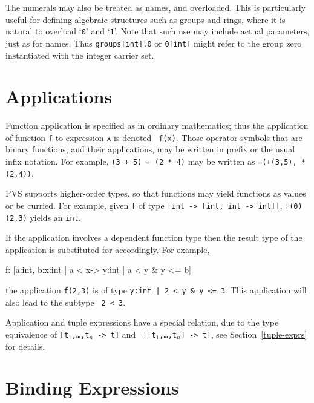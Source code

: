 The numerals may also be treated as names, and
overloaded. This
is particularly useful for defining algebraic structures such as groups
and rings, where it is natural to overload `\texttt{0}' and `\texttt{1}'.
Note that such use may include actual parameters, just as for names.  Thus
\texttt{groups[int].0} or \texttt{0[int]} might refer to the group zero
instantiated with the integer carrier set.

\section{Applications}

Function application is specified as in ordinary mathematics; thus the
application of function \texttt{f} to expression \texttt{x} is denoted \texttt{
f(x)}.  Those operator symbols that are binary functions, and their
applications, may be written in prefix or the usual infix notation.  For
example, \texttt{(3 + 5) = (2 * 4)} may be written as \texttt{=(+(3,5),
*(2,4))}.

PVS supports higher-order types, so that functions may yield functions
as values or be curried.  For example, given
\texttt{f} of type \texttt{[int -> [int, int -> int]]}, \texttt{f(0)(2,3)}
yields an \texttt{int}.

If the application involves a dependent function type then the result
type of the application is substituted for accordingly.  For example,
\begin{pvsex}
  f: [a:int, b:\setb{}x:int | a < x\sete -> \setb{}y:int | a < y & y <= b\sete]
\end{pvsex}
the application \texttt{f(2,3)} is of type \texttt{\setb{}y:int | 2 < y \& y <=
3\sete}.  This application will also lead to the subtype \tcc\ \texttt{2 < 3}.

Application and tuple expressions have a special relation, due to the
type equivalence of \texttt{[t$_1$,\ldots,t$_n$ -> t]} and \texttt{
[[t$_1$,\ldots,t$_n$] -> t]}, see Section~\ref{tuple-exprs} for details.

\section{Binding Expressions}\label{binding-expressions}

